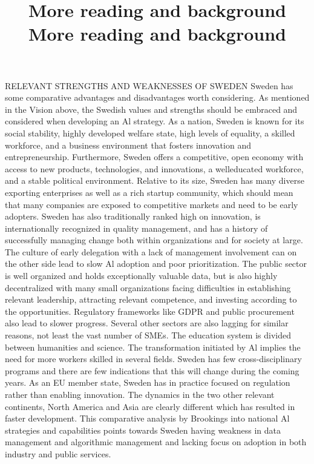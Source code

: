 \title{
More reading and background
}
RELEVANT STRENGTHS AND WEAKNESSES OF SWEDEN
Sweden has some comparative advantages and disadvantages worth considering.
As mentioned in the Vision above, the Swedish values and strengths should be embraced and considered when developing an Al strategy. As a nation, Sweden is known for its social stability, highly developed welfare state, high levels of equality, a skilled workforce, and a business environment that fosters innovation and entrepreneurship. Furthermore, Sweden offers a competitive, open economy with access to new products, technologies, and innovations, a welleducated workforce, and a stable political environment.
Relative to its size, Sweden has many diverse exporting enterprises as well as a rich startup community, which should mean that many companies are exposed to competitive markets and need to be early adopters.
Sweden has also traditionally ranked high on innovation, is internationally recognized in quality management, and has a history of successfully managing change both within organizations and for society at large. The culture of early delegation with a lack of management involvement can on the other side lead to slow Al adoption and poor prioritization.
The public sector is well organized and holds exceptionally valuable data, but is also highly decentralized with many small organizations facing difficulties in establishing relevant leadership, attracting relevant competence, and investing according to the opportunities. Regulatory frameworks like GDPR and public procurement also lead to slower progress. Several other sectors are also lagging for similar reasons, not least the vast number of SMEs.
The education system is divided between humanities and science. The transformation initiated by Al implies the need for more workers skilled in several fields. Sweden has few cross-disciplinary programs and there are few indications that this will change during the coming years.
As an EU member state, Sweden has in practice focused on regulation rather than enabling innovation. The dynamics in the two other relevant continents, North America and Asia are clearly different which has resulted in faster development.
This comparative analysis by Brookings into national Al strategies and capabilities points towards Sweden having weakness in data management and algorithmic management and lacking focus on adoption in both industry and public services.

\title{
More reading and background
}
